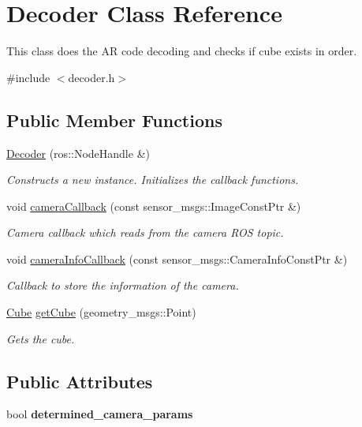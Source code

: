 \hypertarget{class_decoder}{}\section{Decoder Class Reference}
\label{class_decoder}


This class does the AR code decoding and checks if cube exists in order.  




{\ttfamily \#include $<$decoder.\+h$>$}

\subsection*{Public Member Functions}
\begin{DoxyCompactItemize}
\item 
\hyperlink{class_decoder_a4ffe94fb988df3f66811de2c38c81d09}{Decoder} (ros\+::\+Node\+Handle \&)
\begin{DoxyCompactList}\small\item\em Constructs a new instance. Initializes the callback functions. \end{DoxyCompactList}\item 
void \hyperlink{class_decoder_ad1a01f7987bb122964af9ca6464189b5}{camera\+Callback} (const sensor\+\_\+msgs\+::\+Image\+Const\+Ptr \&)
\begin{DoxyCompactList}\small\item\em Camera callback which reads from the camera R\+OS topic. \end{DoxyCompactList}\item 
void \hyperlink{class_decoder_addeeacb824bc9fb0ecd05b04a842c033}{camera\+Info\+Callback} (const sensor\+\_\+msgs\+::\+Camera\+Info\+Const\+Ptr \&)
\begin{DoxyCompactList}\small\item\em Callback to store the information of the camera. \end{DoxyCompactList}\item 
\hyperlink{struct_cube}{Cube} \hyperlink{class_decoder_a3bb9712e4f2eca33efb2382221b501ad}{get\+Cube} (geometry\+\_\+msgs\+::\+Point)
\begin{DoxyCompactList}\small\item\em Gets the cube. \end{DoxyCompactList}\end{DoxyCompactItemize}
\subsection*{Public Attributes}
\begin{DoxyCompactItemize}
\item 
\mbox{\label{class_decoder_a6157c376feee37dcaa751e00fcc4f83f}} 
bool {\bfseries determined\+\_\+camera\+\_\+params}
\end{DoxyCompactItemize}


